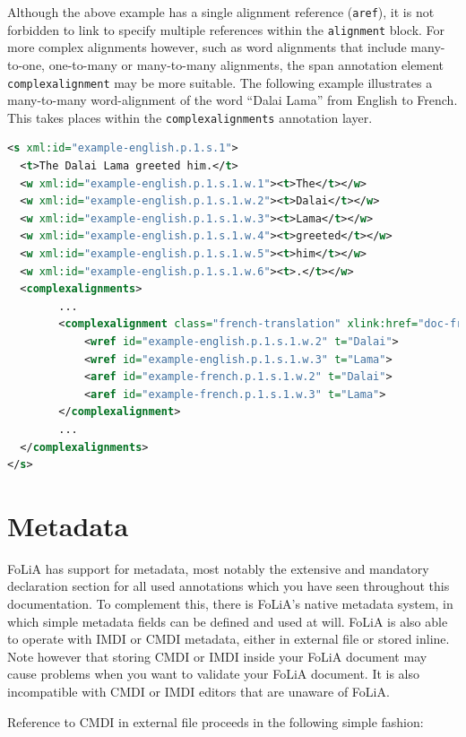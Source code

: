 \documentclass[a4paper,12pt]{report}
\begin{document}
Although the above example has a single alignment reference (\texttt{aref}), it is not forbidden to link to specify multiple references within the \texttt{alignment} block. For more complex alignments however, such as word alignments that include many-to-one, one-to-many or many-to-many alignments, the span annotation element \texttt{complexalignment} may be more suitable. The following example illustrates a many-to-many word-alignment of the word ``Dalai Lama'' from English to French. This takes places within the \texttt{complexalignments} annotation layer.

\begin{lstlisting}[language=xml]
<s xml:id="example-english.p.1.s.1">
  <t>The Dalai Lama greeted him.</t>
  <w xml:id="example-english.p.1.s.1.w.1"><t>The</t></w>
  <w xml:id="example-english.p.1.s.1.w.2"><t>Dalai</t></w>
  <w xml:id="example-english.p.1.s.1.w.3"><t>Lama</t></w>
  <w xml:id="example-english.p.1.s.1.w.4"><t>greeted</t></w>
  <w xml:id="example-english.p.1.s.1.w.5"><t>him</t></w>
  <w xml:id="example-english.p.1.s.1.w.6"><t>.</t></w>
  <complexalignments>
        ...
        <complexalignment class="french-translation" xlink:href="doc-french.xml" xlink:type="simple">
            <wref id="example-english.p.1.s.1.w.2" t="Dalai">
            <wref id="example-english.p.1.s.1.w.3" t="Lama">
            <aref id="example-french.p.1.s.1.w.2" t="Dalai">
            <aref id="example-french.p.1.s.1.w.3" t="Lama">
        </complexalignment>
        ...
  </complexalignments>
</s>
\end{lstlisting}




\section{Metadata}

FoLiA has support for metadata, most notably the extensive and mandatory declaration section for all used annotations which you have seen throughout this documentation. To complement this, there is FoLiA's native metadata system, in which simple metadata fields can be defined and used at will. FoLiA is also able to operate with IMDI or CMDI metadata, either in external file or stored inline. Note however that storing CMDI or IMDI inside your FoLiA document may cause problems when you want to validate your FoLiA document. It is also incompatible with CMDI or IMDI editors that are unaware of FoLiA.

Reference to CMDI in external file proceeds in the following simple fashion:
\end{document}
